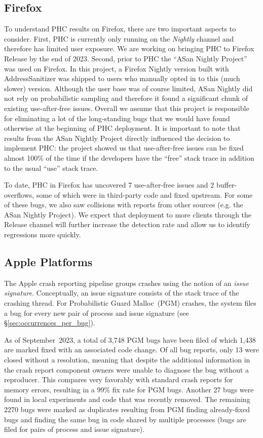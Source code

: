 \figCrashes

\subsection{Firefox}

To understand PHC results on Firefox, there are two important aspects to
consider. First, PHC is currently only running on the \emph{Nightly}
channel and therefore has limited user exposure. We are working on bringing PHC
to Firefox Release by the end of 2023. Second, prior to PHC the ``ASan Nightly
Project'' was used on Firefox. In this project, a Firefox Nightly version built
with AddressSanitizer was shipped to users who manually opted in to this (much
slower) version. Although the user base was of course limited, ASan Nightly did
not rely on probabilistic sampling and therefore it found a significant chunk
of existing use-after-free issues. Overall we assume that this project is
responsible for eliminating a lot of the long-standing bugs that we would have
found otherwise at the beginning of PHC deployment. It is important to note
that results from the ASan Nightly Project directly influenced the decision to
implement PHC: the project showed us that use-after-free issues can be fixed
almost 100\% of the time if the developers have the ``free'' stack trace in
addition to the usual ``use'' stack trace.

To date, PHC in Firefox has uncovered 7 use-after-free issues and 2
buffer-overflows, some of which were in third-party code and fixed upstream.
For some of these bugs, we also saw collisions with reports from other sources
(e.g. the ASan Nightly Project). We expect that deployment to more clients
through the Release channel will further increase the detection rate and allow
us to identify regressions more quickly.

\subsection{Apple Platforms}

The Apple crash reporting pipeline groups crashes using the notion of an
\emph{issue signature}.  Conceptually, an issue signature consists of the stack
trace of the crashing thread.  For Probabilistic Guard Malloc~(PGM) crashes,
the system files a bug for every new pair of process and issue signature (see
\S\ref{sec:occurrences_per_bug}).

As of September~2023, a total of 3,748 PGM bugs have been filed of which 1,438
are marked fixed with an associated code change.  Of all bug reports, only 13
were closed without a resolution, meaning that despite the additional
information in the crash report component owners were unable to diagnose the
bug without a reproducer.  This compares very favorably with standard crash
reports for memory errors, resulting in a 99\% fix rate for PGM bugs.  Another
27 bugs were found in local experiments and code that was recently removed.
The remaining 2270 bugs were marked as duplicates resulting from PGM finding
already-fixed bugs and finding the same bug in code shared by multiple
processes (bugs are filed for pairs of process and issue signature).


